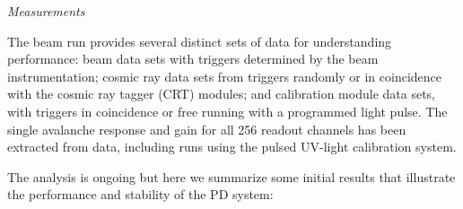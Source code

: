 \textit{  Measurements}
\label{sec:protodune-results}


The  beam run provides several distinct sets of data for understanding  performance: beam data sets with triggers determined by the beam instrumentation; cosmic ray data sets from triggers randomly or in coincidence with the cosmic ray tagger (CRT) modules; and calibration module data sets, with triggers in coincidence or free running with a programmed light pulse. 
The single avalanche response and gain for all \num{256} 
readout channels has been extracted from  data, including runs using the pulsed UV-light calibration system.

The analysis is ongoing but here we summarize some initial results that illustrate the performance and stability of the PD system:

